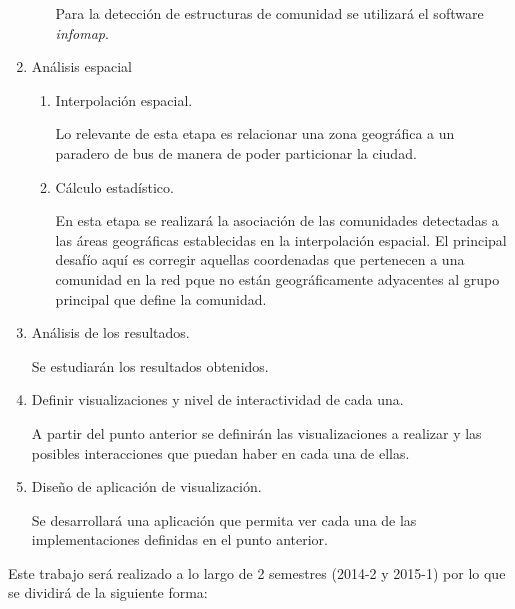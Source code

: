 \documentclass[12pt]{article}
\begin{document}
\begin{enumerate}
\begin{enumerate}
    Para la detección de estructuras de comunidad se utilizará el software \textit{infomap}. 
    \end{enumerate}
    \item Análisis espacial
    \begin{enumerate}
    \item Interpolación espacial.

    Lo relevante de esta etapa es relacionar una zona geográfica a un paradero de bus de manera de poder particionar la ciudad.

    \item Cálculo estadístico.

    En esta etapa se realizará la asociación de las comunidades detectadas a las áreas geográficas establecidas en la interpolación espacial. El principal desafío aquí es corregir aquellas coordenadas que pertenecen a una comunidad en la red pque no están geográficamente adyacentes al grupo principal que define la comunidad.

    \end{enumerate}
    \item Análisis de los resultados.

    Se estudiarán los resultados obtenidos.

    \item Definir visualizaciones y nivel de interactividad de cada una.

    A partir del punto anterior se definirán las visualizaciones a realizar y las posibles interacciones que puedan haber en cada una de ellas.

    \item Diseño de aplicación de visualización.

    Se desarrollará una aplicación que permita ver cada una de las implementaciones definidas en el punto anterior.

    \end{enumerate}

    Este trabajo será realizado a lo largo de 2 semestres (2014-2 y 2015-1) por lo que se dividirá de la siguiente forma:
\end{document}
